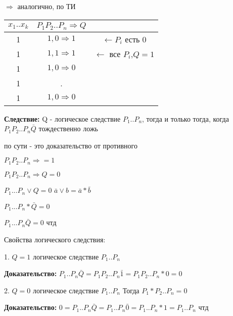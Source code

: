 \documentclass[russian]{lecture-notes}
\begin{document}
    $\Rightarrow$ аналогично, по ТИ

    \begin{table}[h!]
        \begin{tabular}{|c|c|c|}
            \hline
            $x_{1}..x_{k}$ & $P_{1}P_{2}..P_{n} \Rightarrow Q$ &                                 \\ \hline
            1                & $1,0 \Rightarrow 1$               & $\leftarrow P_{i} $ есть 0      \\ \hline
            1                & $1,1 \Rightarrow 1$               & $\leftarrow $ все $P_{i}$,$Q=1$ \\ \hline
            1                & $1,0 \Rightarrow 0$               &                                 \\ \hline
            1                & .                                 &                                 \\ \hline
            1                & $1,0 \Rightarrow 0$               &                                 \\ \hline
        \end{tabular}
    \end{table}

    \textbf{Следствие:} Q - логическое следствие $P_{1}..P_{n}$, тогда и только тогда, когда $P_{1}P_{2}..P_{n}\bar{Q}$ тождественно ложь

    \begin{remark}
        по сути - это доказательство от противного
    \end{remark}

    $P_{1}P_{2}..P_{n} \Rightarrow = 1$

    $P_{1}P_{2}..P_{n} \Rightarrow Q = 0 $

    $P_{1} ... P_{n} \lor Q = 0$ \quad $\bar{a} \lor b = \bar{a} * \bar{b}$

    $P_{1}... P_{n} * \bar{Q} = 0$

    $P_{1} ... P_{n} \bar{Q} = 0$ чтд

    Свойства логического следствия:

    1. $Q = 1$ логическое следствие $P_{1}..P_{n}$

    \textbf{Доказательство:} $P_{1}..P_{n} \bar{Q} = P_{1}P_{2}..P_{n} \bar{1} = P_{1}P_{2}..P_{n}*0 = 0$

    2. $Q = 0$ логическое следствие $P_{1}..P_{n}$
    Тогда $P_{1}*P_{2}..P_{n}=0$

    \textbf{Доказательство:} $0 = P_{1}..P_{n} \bar{Q} = P_{1}..P_{n} \bar{0} = P_{1}..P_{n}*1 = P_{1}..P_{n}$ чтд
\end{document}
